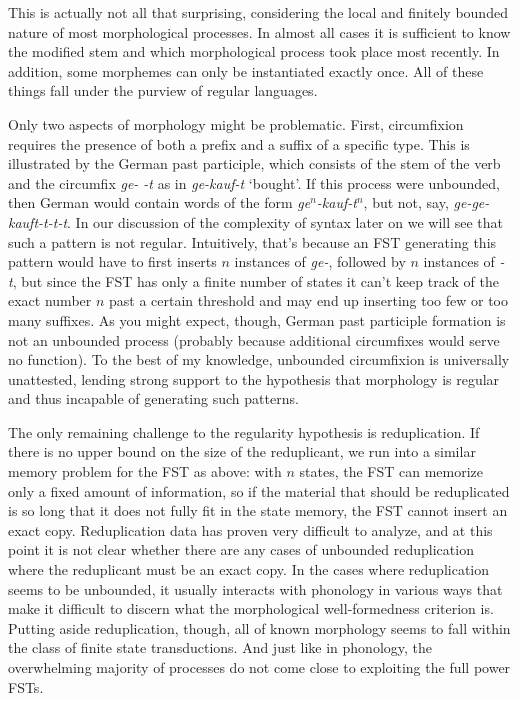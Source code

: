 This is actually not all that surprising, considering the local and finitely bounded nature of most morphological processes.
In almost all cases it is sufficient to know the modified stem and which morphological process took place most recently.
In addition, some morphemes can only be instantiated exactly once.
All of these things fall under the purview of regular languages.

Only two aspects of morphology might be problematic.
First, circumfixion requires the presence of both a prefix and a suffix of a specific type.
This is illustrated by the German past participle, which consists of the stem of the verb and the circumfix \emph{ge- -t} as in \emph{ge-kauf-t} `bought'.
If this process were unbounded, then German would contain words of the form \emph{ge$^n$-kauf-t$^n$}, but not, say, \emph{ge-ge-kauft-t-t-t}.
In our discussion of the complexity of syntax later on we will see that such a pattern is not regular.
Intuitively, that's because an FST generating this pattern would have to first inserts $n$ instances of \emph{ge-}, followed by $n$ instances of \emph{-t}, but since the FST has only a finite number of states it can't keep track of the exact number $n$ past a certain threshold and may end up inserting too few or too many suffixes.
As you might expect, though, German past participle formation is not an unbounded process (probably because additional circumfixes would serve no function).
To the best of my knowledge, unbounded circumfixion is universally unattested, lending strong support to the hypothesis that morphology is regular and thus incapable of generating such patterns.

The only remaining challenge to the regularity hypothesis is reduplication.
If there is no upper bound on the size of the reduplicant, we run into a similar memory problem for the FST as above: with $n$ states, the FST can memorize only a fixed amount of information, so if the material that should be reduplicated is so long that it does not fully fit in the state memory, the FST cannot insert an exact copy.
Reduplication data has proven very difficult to analyze, and at this point it is not clear whether there are any cases of unbounded reduplication where the reduplicant must be an exact copy.
In the cases where reduplication seems to be unbounded, it usually interacts with phonology in various ways that make it difficult to discern what the morphological well-formedness criterion is.
Putting aside reduplication, though, all of known morphology seems to fall within the class of finite state transductions.
And just like in phonology, the overwhelming majority of processes do not come close to exploiting the full power FSTs.

